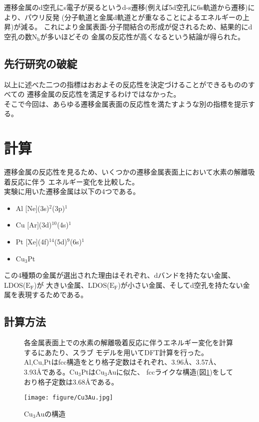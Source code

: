 \documentclass[12pt]{ltjsarticle}
\begin{document}
遷移金属のd空孔にs電子が戻るというd-s遷移(例えば5d空孔に6s軌道から遷移)により、パウリ反発
(分子軌道と金属d軌道とが重なることによるエネルギーの上昇)が減る。\cite{MORIKAWA2006}
これにより金属表面-分子間結合の形成が促されるため、結果的にd空孔の数$\text{N}_\text{h}$が多いほどその
金属の反応性が高くなるという結論が得られた。\cite{J.Harris1985}

\subsection{先行研究の破綻}
以上に述べた二つの指標はおおよその反応性を決定づけることができるもののすべての
遷移金属の反応性を満足するわけではなかった。\\
そこで今回は、あらゆる遷移金属表面の反応性を満たすような別の指標を提示する。

\section{計算}
遷移金属の反応性を見るため、いくつかの遷移金属表面上において水素の解離吸着反応に伴う
エネルギー変化を比較した。\\
実験に用いた遷移金属は以下の4つである。

\begin{itemize}
 \item Al [Ne](3s)$^\text{2}$(3p)$^\text{1}$
 \item Cu [Ar](3d)$^\text{10}$(4s)$^\text{1}$
 \item Pt [Xe](4f)$^\text{14}$(5d)$^\text{9}$(6s)$^\text{1}$
 \item $\text{Cu}_\text{3}$Pt
\end{itemize}

この4種類の金属が選出された理由はそれぞれ、dバンドを持たない金属、LDOS($\text{E}_\text{F}$)が
大きい金属、LDOS($\text{E}_\text{F}$)が小さい金属、そしてd空孔を持たない金属を表現するためである。

\subsection{計算方法}

\begin{figure}[hbtp]
\begin{minipage}{.5\textwidth}
    各金属表面上での水素の解離吸着反応に伴うエネルギー変化を計算するにあたり、スラブ
    モデルを用いてDFT計算を行った。
    Al,Cu,Ptはfcc構造をとり格子定数はそれぞれ、3.96$\mbox{\AA}$、3.57$\mbox{\AA}$、
    3.93$\mbox{\AA}$である。$\text{Cu}_\text{3}$Ptは$\text{Cu}_\text{3}$Auに似た、
    fccライクな構造(図\ref{fig:Cu3Au})をしており格子定数は3.68$\mbox{\AA}$である。
\end{minipage}
\hfill
\begin{minipage}{.45\textwidth}
    \begin{center}
     \texttt{[image: figure/Cu3Au.jpg]}
    \end{center}
    \caption{Cu$_\text{3}$Auの構造}
    \label{fig:Cu3Au}
\end{minipage}
\end{figure}
\end{document}
